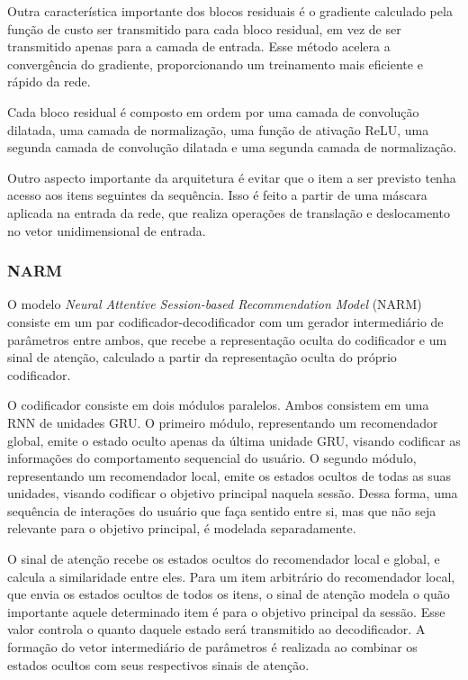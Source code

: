 Outra característica importante dos blocos residuais é o gradiente
calculado pela função de custo ser transmitido para cada bloco residual, em vez
de ser transmitido apenas para a camada de entrada. Esse método acelera a
convergência do gradiente, proporcionando um treinamento mais eficiente e rápido
da rede.

Cada bloco residual é composto em ordem por uma camada de convolução dilatada,
uma camada de normalização, uma função de ativação ReLU, uma segunda camada de
convolução dilatada e uma segunda camada de normalização.

Outro aspecto importante da arquitetura é evitar que o item a ser previsto tenha
acesso aos itens seguintes da sequência. Isso é feito a partir de uma máscara
aplicada na entrada da rede, que realiza operações de translação e deslocamento
no vetor unidimensional de entrada.

\subsubsection{NARM}
O modelo \textit{Neural Attentive Session-based Recommendation Model} (NARM)
\cite{narm} consiste em um par codificador-decodificador com um gerador
intermediário de parâmetros entre ambos, que recebe a representação oculta do
codificador e um sinal de atenção, calculado a partir da representação oculta do
próprio codificador.

O codificador consiste em dois módulos paralelos. Ambos consistem em uma RNN de
unidades GRU. O primeiro módulo, representando um recomendador global, emite o
estado oculto apenas da última unidade GRU, visando codificar as informações do
comportamento sequencial do usuário. O segundo módulo, representando um
recomendador local, emite os estados ocultos de todas as suas unidades, visando
codificar o objetivo principal naquela sessão. Dessa forma, uma sequência de
interações do usuário que faça sentido entre si, mas que não seja relevante para
o objetivo principal, é modelada separadamente.

O sinal de atenção recebe os estados ocultos do recomendador local e global, e
calcula a similaridade entre eles. Para um item arbitrário do recomendador local, que envia os estados ocultos de
todos os itens, o sinal de atenção modela o quão importante aquele determinado
item é para o objetivo principal da sessão. Esse valor controla o quanto daquele
estado será transmitido ao decodificador. A formação do vetor intermediário de
parâmetros é realizada ao combinar os estados ocultos com seus respectivos
sinais de atenção.

